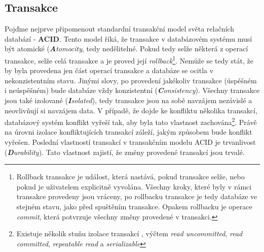 
\subsection{Transakce}
Pojďme nejprve připomenout standardní transakční model světa relačních databází - \textbf{ACID}. Tento model říká, že transakce v databázovém systému musí být atomické (\textit{\textbf{A}tomocity}, tedy nedělitelné. Pokud tedy selže některá z operací transakce, selže celá transakce a je proved její \textit{rollback}\footnote{Rollback transakce je událost, která nastává, pokud transakce selže, nebo pokud je uživatelem explicitně vyvolána. Všechny kroky, které byly v rámci transakce provedeny jsou vráceny, po rollbacku transakce je tedy databáze ve stejném stavu, jako před spuštěním transakce. Opakem rollbacku je operace \textit{commit}, která potvrzuje všechny změny provedené v transakci.}. Nemůže se tedy stát, že by byla provedena jen část operací transakce a databáze se ocitla v nekonzistentním stavu. Jinými slovy, po provedení jakékoliv transakce (úspěšném i neúspěšném) bude databáze vždy konzistentní (\textit{\textbf{C}onsistency}). Všechny transakce jsou také izolované (\textit{\textbf{I}solated}), tedy transakce jsou na sobě navzájem nezávislé a neovlivňují si navzájem data. V případě, že dojde ke konfliktu několika transakcí, databázový systém konflikt vyřeší tak, aby byla tato vlastnost zachována\footnote{Existuje několik stuňu izolace transakcí , výčtem \textit{read uncommitted}, \textit{read committed}, \textit{repeatable read} a \textit{serializable}}. Právě na úrovni izolace konfliktujících transakcí záleží, jakým způsobem bude konflikt vyřešen. Poslední vlastností transakcí v transakčním modelu ACID je trvanlivost (\textit{\textbf{D}urability}). Tato vlastnost zajistí, že změny provedené transakcí jsou trvalé. 

